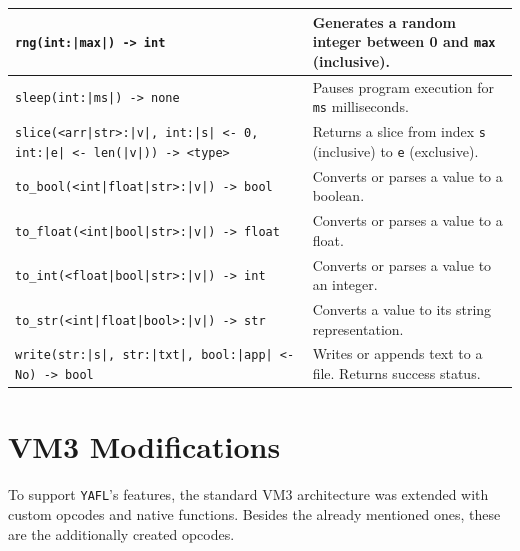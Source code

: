 \documentclass[11pt,a4paper]{article}
\begin{document}
\begin{xltabular}{\textwidth}{|>{\raggedright\arraybackslash}p{6.5cm} | X|}
  \hline
  \texttt{rng(int:|max|) -> int} & Generates a random integer between 0 and \texttt{max} (inclusive). \\
  \hline
  \texttt{sleep(int:|ms|) -> none} & Pauses program execution for \texttt{ms} milliseconds. \\
  \hline
  \texttt{slice(<arr|str>:|v|, int:|s| <- 0, int:|e| <- len(|v|)) -> <type>} & Returns a slice from index \texttt{s} (inclusive) to \texttt{e} (exclusive). \\
  \hline
  \texttt{to\_bool(<int|float|str>:|v|) -> bool} & Converts or parses a value to a boolean. \\
  \hline
  \texttt{to\_float(<int|bool|str>:|v|) -> float} & Converts or parses a value to a float. \\
  \hline
  \texttt{to\_int(<float|bool|str>:|v|) -> int} & Converts or parses a value to an integer. \\
  \hline
  \texttt{to\_str(<int|float|bool>:|v|) -> str} & Converts a value to its string representation. \\
  \hline
  \texttt{write(str:|s|, str:|txt|, bool:|app| <- No) -> bool} & Writes or appends text to a file. Returns success status. \\ [1ex]
  \hline
\end{xltabular}

\section{VM3 Modifications}

To support \texttt{YAFL}'s features, the standard VM3 architecture was extended with custom opcodes and native functions.
Besides the already mentioned ones, these are the additionally created opcodes.
\end{document}
